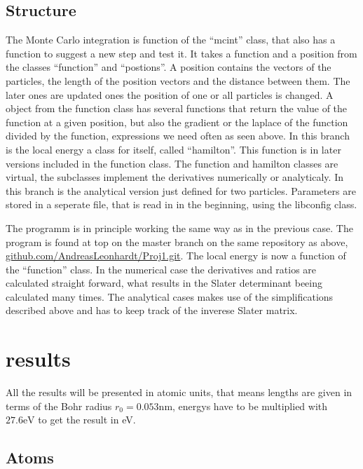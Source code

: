 \documentclass[a4paper,10pt]{article}
\begin{document}
\subsection{Structure}





The Monte Carlo integration is function of the ``mcint'' class, that also has a function to suggest a new step 
and test it. It takes a function and a position from the classes ``function'' and ``postions''. A position contains the vectors of the particles, 
the length of the position vectors and
the distance between them. The later ones are updated ones the position of one or all particles is changed. 
A object from the function class has several functions that return the value of the function at a given position, 
but also the gradient or the laplace of the function divided by the function, expressions we need often as seen above. 
In this branch is the local energy a class for itself, called ``hamilton''. This function is in later versions included in the function class.
The function and hamilton classes are virtual, the subclasses implement the derivatives numerically or analyticaly. 
In this branch is the analytical version just defined for two particles. 
Parameters are stored in a seperate file, that is read in in the beginning, using the libconfig class.

The programm is in principle working the same way as in the previous case. The program is found at top on the master branch on the same repository as above,
\href{https://github.com/AndreasLeonhardt/Proj1.git}{github.com/AndreasLeonhardt/Proj1.git}.
The local energy is now a function of the ``function'' class. 
In the numerical case the derivatives and ratios are calculated straight forward, what results in the Slater determinant beeing calculated many times.
The analytical cases makes use of the simplifications described above and has to keep track of the inverese Slater matrix. 


\section{results}
All the results will be presented in atomic units, that means lengths are given in terms of the Bohr radius $r_0 = 0.053\text{nm}$, energys have to be multiplied with $27.6\text{eV}$ 
to get the result in eV. 

\subsection{Atoms}
\end{document}
